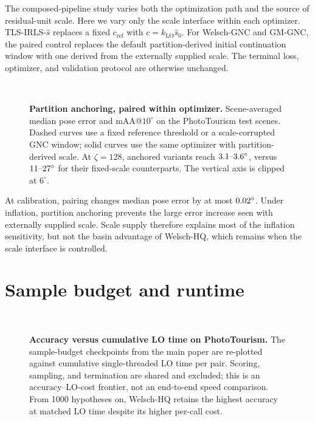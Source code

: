 \documentclass[runningheads]{llncs}
\newcommand{\klo}{k_{\mathrm{LO}}}
\newcommand{\tlsirls}{TLS-IRLS}
\begin{document}
The composed-pipeline study varies both the optimization path and the source
of residual-unit scale. Here we vary only the scale interface within each
optimizer. \tlsirls{}-$\hat s$ replaces a fixed $c_{\mathrm{ref}}$ with
$c=\klo\hat s_0$. For Welsch-GNC and GM-GNC, the paired control replaces
the default partition-derived initial continuation window with one derived
from the externally supplied scale. The terminal loss, optimizer, and validation
protocol are otherwise unchanged.

\begin{figure}[t]
\centering
{}\\[3pt]
\caption{\textbf{Partition anchoring, paired within optimizer.}
Scene-averaged median pose error and mAA@$10^\circ$ on the \PTTestScenes{} PhotoTourism test scenes.
Dashed curves use a fixed reference threshold or a scale-corrupted GNC
window; solid curves use the same optimizer with partition-derived scale.
At $\zeta=128$, anchored variants reach $3.1\text{--}3.6^\circ$, versus
$11\text{--}27^\circ$ for their fixed-scale counterparts. The vertical axis is
clipped at $6^\circ$.}
\label{fig:supp-anchoring}
\end{figure}

At calibration, pairing changes median pose error by at most $0.02^\circ$.
Under inflation, partition anchoring prevents the large error increase seen
with externally supplied scale. Scale supply therefore explains most of the
inflation sensitivity, but not the basin advantage of Welsch-HQ, which remains
when the scale interface is controlled.

\section{Sample budget and runtime}
	\label{sec:supp-budget}

	\begin{figure}[t]
		\centering
		\\[3pt]
		\caption{\textbf{Accuracy versus cumulative LO time on PhotoTourism.}
			The sample-budget checkpoints from the main paper are re-plotted against
			cumulative single-threaded LO time per pair. Scoring, sampling, and
			termination are shared and excluded; this is an accuracy--LO-cost frontier,
			not an end-to-end speed comparison. From 1000 hypotheses on, Welsch-HQ retains the highest accuracy
			at matched LO time despite its higher per-call cost.}
		\label{fig:supp-budget-time}
	\end{figure}
\end{document}
